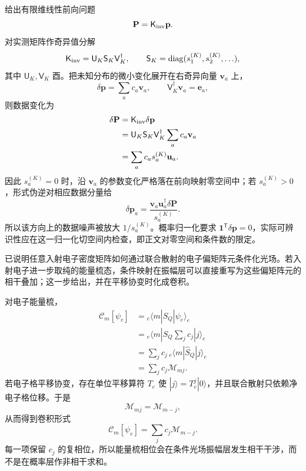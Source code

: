 \begin{exbox}[光子统计反演与电子后选择条件操作]
\medskip

 给出有限维线性前向问题
\[
\mathbf P=\mathsf K_{\rm inv}\mathbf p.
\]
对实测矩阵作奇异值分解
\[
\mathsf K_{\rm inv}=\mathsf U_K\mathsf S_K\mathsf V_K^\dagger,
\qquad
\mathsf S_K=\operatorname{diag}(s_1^{(K)},s_2^{(K)},\ldots),
\]
其中 $\mathsf U_K,\mathsf V_K$ 酉。把未知分布的微小变化展开在右奇异向量 $\mathbf v_a$ 上，
\[
\delta\mathbf p=\sum_a c_a\mathbf v_a,
\qquad
\mathsf V_K^\dagger\mathbf v_a=\mathbf e_a,
\]
则数据变化为
\begin{align*}
\delta\mathbf P
&=\mathsf K_{\rm inv}\delta\mathbf p\\
&=\mathsf U_K\mathsf S_K\mathsf V_K^\dagger
\sum_a c_a\mathbf v_a\\
&=\sum_a c_a s_a^{(K)}\mathbf u_a.
\end{align*}
因此 $s_a^{(K)}=0$ 时，沿 $\mathbf v_a$ 的参数变化严格落在前向映射零空间中；若 $s_a^{(K)}>0$，形式伪逆对相应数据分量给
\[
\delta\mathbf p_a
=\frac{\mathbf v_a\mathbf u_a^\dagger\delta\mathbf P}{s_a^{(K)}}.
\]
所以该方向上的数据噪声被放大 $1/s_a^{(K)}$。概率归一化要求 $\mathbf 1^{\mathsf T}\delta\mathbf p=0$，实际可辨识性应在这一归一化切空间内检查，即正文对零空间和条件数的限定。

\medskip

 已说明任意入射电子密度矩阵如何通过联合散射的电子偏矩阵元条件化光场。若入射电子进一步取纯的能量梳态，条件映射在振幅层可以直接重写为这些偏矩阵元的相干叠加；这一步给出，并在平移协变时化成卷积。

对电子能量梳，\begin{align*}
\mathscr C_m[\psi_e]
&={}_e\!\langle m|\hat S_Q|\psi_e\rangle_e\\
&={}_e\!\langle m|\hat S_Q
\sum_jc_j|j\rangle_e\\
&=\sum_jc_j\,{}_e\!\langle m|\hat S_Q|j\rangle_e\\
&=\sum_jc_j\mathscr M_{mj}.
\end{align*}
若电子格平移协变，存在单位平移算符 $T_e$ 使 $|j\rangle=T_e^j|0\rangle$，并且联合散射只依赖净电子格位移。于是
\[
\mathscr M_{mj}=\mathscr M_{m-j},
\]
从而得到卷积形式
\[
\mathscr C_m[\psi_e]
=\sum_jc_j\mathscr M_{m-j}.
\]
每一项保留 $c_j$ 的复相位，所以能量梳相位会在条件光场振幅层发生相干干涉，而不是在概率层作非相干求和。
\end{exbox}




